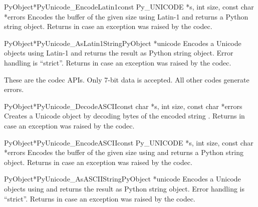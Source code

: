 \documentclass{manual}
\begin{document}
\begin{cfuncdesc}{PyObject*}{PyUnicode_EncodeLatin1}{const Py_UNICODE *s,
                                                     int size,
                                                     const char *errors}
Encodes the  buffer of the given size using Latin-1
and returns a Python string object.  Returns \NULL{} in case an
exception was raised by the codec.
\end{cfuncdesc}

\begin{cfuncdesc}{PyObject*}{PyUnicode_AsLatin1String}{PyObject *unicode}
Encodes a Unicode objects using Latin-1 and returns the result as
Python string object. Error handling is ``strict''. Returns
\NULL{} in case an exception was raised by the codec.
\end{cfuncdesc}


These are the \ASCII{} codec APIs.  Only 7-bit \ASCII{} data is
accepted. All other codes generate errors.

\begin{cfuncdesc}{PyObject*}{PyUnicode_DecodeASCII}{const char *s,
                                                    int size,
                                                    const char *errors}
Creates a Unicode object by decoding  bytes of the
\ASCII{} encoded string . Returns \NULL{} in case an exception
was raised by the codec.
\end{cfuncdesc}

\begin{cfuncdesc}{PyObject*}{PyUnicode_EncodeASCII}{const Py_UNICODE *s,
                                                    int size,
                                                    const char *errors}
Encodes the  buffer of the given size using
\ASCII{} and returns a Python string object.  Returns \NULL{} in case
an exception was raised by the codec.
\end{cfuncdesc}

\begin{cfuncdesc}{PyObject*}{PyUnicode_AsASCIIString}{PyObject *unicode}
Encodes a Unicode objects using \ASCII{} and returns the result as Python
string object. Error handling is ``strict''. Returns
\NULL{} in case an exception was raised by the codec.
\end{cfuncdesc}

\end{document}

